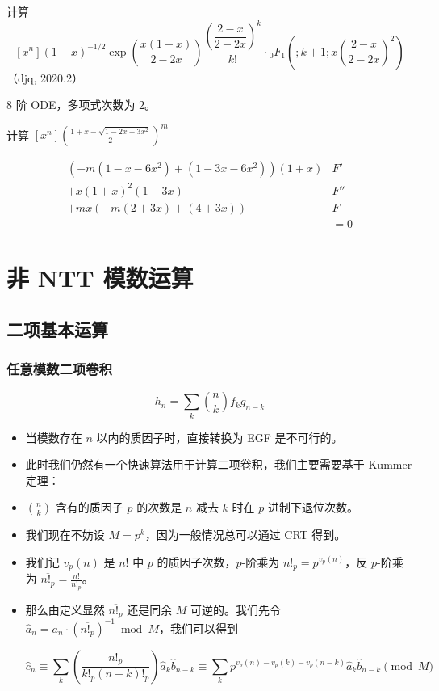 \documentclass[mathserif]{ctexbeamer}
\begin{document}
\frame
{
  \begin{example}[中国象棋]
  
  计算 $$[x^n](1-x)^{-1/2} \exp\left(\frac{x(1+x)}{2-2x}\right) \frac {\left(\dfrac{2-x}{2-2x}\right)^k}{k!} \cdot
{
{}_0 F_1\left(;k+1; x\left(\frac{2-x}{2-2x}\right)^2\right)
}$$
（djq, 2020.2）
  \end{example}
  
  $8$ 阶 ODE，多项式次数为 $2$。
}

\frame
{
  \begin{example}[惠和惠惠和惠惠惠]
  
  计算 $[x^n]\left(\frac{1+x-\sqrt{1-2x-3x^2}}2\right)^m$
  \end{example}
  
  \begin{align*}
(-m(1-x-6x^2)+(1-3x-6x^2))(1+x) & F'\\
+ x(1+x)^2(1-3x)&F''\\
+ mx(-m(2+3x)+(4+3x)) &F\\
&=0
\end{align*}
}

\section{非 NTT 模数运算}
\frame{\sectionpage}

\subsection{二项基本运算}
\frame
{
  \frametitle{任意模数二项卷积}
  
  $$ h_n =\sum_k \binom nk f_kg_{n-k} $$
  
  \begin{itemize}
  \item<1-> 当模数存在 $n$ 以内的质因子时，直接转换为 EGF 是不可行的。
  
  \item<2-> 此时我们仍然有一个快速算法用于计算二项卷积，我们主要需要基于 Kummer 定理：
  \item<2-> $\binom n k$ 含有的质因子 $p$ 的次数是 $n$ 减去 $k$ 时在 $p$ 进制下退位次数。
  \end{itemize}
}

\frame
{
  \begin{itemize}
  \item<1-> 我们现在不妨设 $M=p^k$，因为一般情况总可以通过 CRT 得到。
  \item<2-> 我们记 $v_p(n)$ 是 $n!$ 中 $p$ 的质因子次数，$p$-阶乘为 $n!_p = p^{v_p(n)}$，反 $p$-阶乘为 $\overline{n!_p} = \frac{n!}{n!_p}$。

  \item<3-> 那么由定义显然 $\overline{n!_p}$ 还是同余 $M$ 可逆的。我们先令 $\widehat a_n = a_n \cdot \left( \overline{n!_p} \right)^{-1} \bmod M$，我们可以得到

$$
\widehat c_n \equiv \sum_k \left(\frac{n!_p}{k!_p (n-k)!_p}\right) \widehat a_k \widehat b_{n-k} \equiv \sum_k p^{v_p(n)-v_p(k)-v_p(n-k)} \widehat a_k \widehat b_{n-k} \pmod M
$$
  \end{itemize}
}
\end{document}
